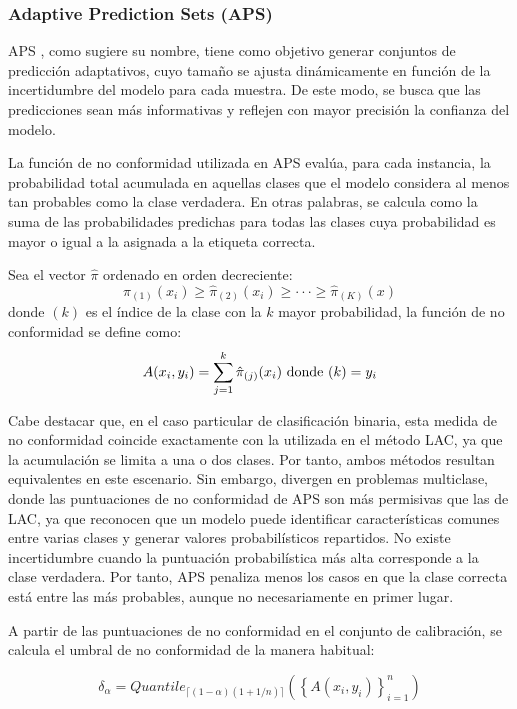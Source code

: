 \subsubsection{Adaptive Prediction Sets (APS)}

APS \cite{romano2020}, como sugiere su nombre, tiene como objetivo generar conjuntos de predicción adaptativos, cuyo tamaño se ajusta dinámicamente en función de la incertidumbre del modelo para cada muestra. De este modo, se busca que las predicciones sean más informativas y reflejen con mayor precisión la confianza del modelo.

La función de no conformidad utilizada en APS evalúa, para cada instancia, la probabilidad total acumulada en aquellas clases que el modelo considera al menos tan probables como la clase verdadera. En otras palabras, se calcula como la suma de las probabilidades predichas para todas las clases cuya probabilidad es mayor o igual a la asignada a la etiqueta correcta.

Sea el vector $\hat{\pi}$ ordenado en orden decreciente: 
$$
\hat{\pi}_{(1)}(x_i) \ge \hat{\pi}_{(2)}(x_i) \ge \cdot\cdot\cdot \ge \hat{\pi}_{(K)}(x)
$$
donde $(k)$ es el índice de la clase con la $k$ mayor probabilidad, la función de no conformidad se define como:
$$
A(x_i, y_i) = \sum_{j=1}^k \hat{\pi}_{(j)}(x_i) \textnormal{ donde } (k)=y_i 
$$

Cabe destacar que, en el caso particular de clasificación binaria, esta medida de no conformidad coincide exactamente con la utilizada en el método LAC, ya que la acumulación se limita a una o dos clases. Por tanto, ambos métodos resultan equivalentes en este escenario. Sin embargo, divergen en problemas multiclase, donde las puntuaciones de no conformidad de APS son más permisivas que las de LAC, ya que reconocen que un modelo puede identificar características comunes entre varias clases y generar valores probabilísticos repartidos. No existe incertidumbre cuando la puntuación probabilística más alta corresponde a la clase verdadera. Por tanto, APS penaliza menos los casos en que la clase correcta está entre las más probables, aunque no necesariamente en primer lugar.

A partir de las puntuaciones de no conformidad en el conjunto de calibración, se calcula el umbral de no conformidad de la manera habitual:

$$
\delta_\alpha = Quantile_{ \lceil  (1-\alpha) (1 + 1/n)  \rceil } ( \left\{ A(x_i,y_i) \right\}_{i=1}^n )
$$


